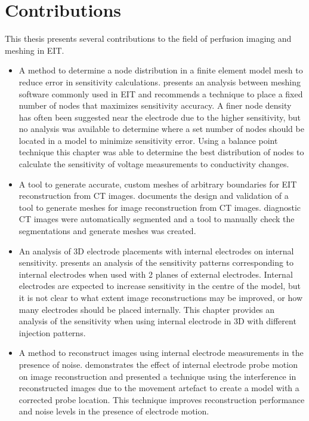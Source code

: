 \section{Contributions}
This thesis presents several contributions to the field of perfusion imaging and 
meshing in EIT.
\begin{itemize}
	\item A method to determine a node distribution in a finite element model mesh
        to reduce error in sensitivity calculations.  presents an 
        analysis between meshing software commonly used in EIT and recommends a technique to 
        place a fixed number of nodes that maximizes sensitivity accuracy. 
        A finer node density has often been suggested near the electrode due to the higher 
        sensitivity, but no analysis was available to determine where a set number of
        nodes should be located in a model to minimize sensitivity error. 
        Using a balance point 
        technique this chapter was able to determine the best distribution of nodes
        to calculate the sensitivity of voltage measurements to conductivity changes.
	\item A tool to generate accurate, custom meshes of arbitrary boundaries for EIT reconstruction from 
        CT images.  documents 
        the design and validation of a tool to generate meshes for image reconstruction from CT images. 
        diagnostic CT images were automatically segmented and a tool to manually check the segmentations
        and generate meshes was created. 
	\item An analysis of 3D electrode placements with internal electrodes on internal sensitivity. 
         presents an analysis of the sensitivity patterns corresponding to 
        internal electrodes when used with 2 planes of external electrodes. Internal electrodes are
        expected to increase sensitivity in the centre of the model, but it is not clear to what extent 
        image reconstructions may be improved, or how many electrodes should be 
        placed internally. This chapter provides an analysis of the sensitivity when using internal
        electrode in 3D with different injection patterns.  
	\item A method to reconstruct images using internal electrode measurements in the presence of noise.
         demonstrates the effect of internal electrode probe motion on image 
        reconstruction and presented a technique using the interference in reconstructed images 
        due to the movement artefact to create a model with a corrected probe location. This technique
        improves reconstruction performance and noise levels in the presence of electrode motion.
\end{itemize}

